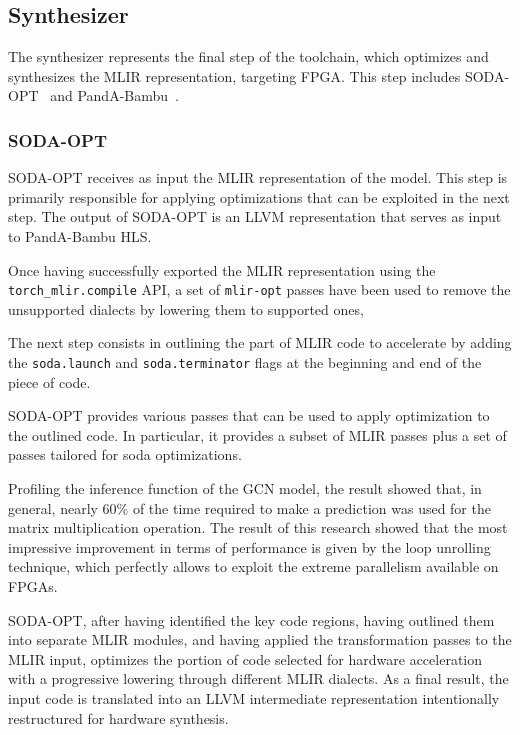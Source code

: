 \documentclass[11pt,a4paper,twocolumn]{article}
\begin{document}
\subsection{Synthesizer}
\label{subsec:synthesizer-toolchain}%

The synthesizer represents the final step of the toolchain, which optimizes and synthesizes the MLIR representation, targeting FPGA\@.
This step includes SODA-OPT~\cite{9786533} and PandA-Bambu~\cite{9586110}.

\subsubsection*{SODA-OPT}
\label{subsec:soda-opt}%

SODA-OPT receives as input the MLIR representation of the model.
This step is primarily responsible for applying optimizations that can be exploited in the next step.
The output of SODA-OPT is an LLVM representation that serves as input to PandA-Bambu HLS\@.

Once having successfully exported the MLIR representation using the \texttt{torch\_mlir.compile} API, a set of \texttt{mlir-opt} passes have been used to remove the unsupported dialects by lowering them to supported ones,

The next step consists in outlining the part of MLIR code to accelerate by adding the \lstinline{soda.launch} and \lstinline{soda.terminator} flags at the beginning and end of the piece of code.

SODA-OPT provides various passes that can be used to apply optimization to the outlined code.
In particular, it provides a subset of MLIR passes plus a set of passes tailored for soda optimizations.

Profiling the inference function of the GCN model, the result showed that, in general, nearly 60\% of the time required to make a prediction was used for the matrix multiplication operation.
The result of this research showed that the most impressive improvement in terms of performance is given by the loop unrolling technique, which perfectly allows to exploit the extreme parallelism available on FPGAs.

SODA-OPT, after having identified the key code regions, having outlined them into separate MLIR modules, and having applied the transformation passes to the MLIR input, optimizes the portion of code selected for hardware acceleration with a progressive lowering through different MLIR dialects.
As a final result, the input code is translated into an LLVM intermediate representation intentionally restructured for hardware synthesis.
\end{document}
